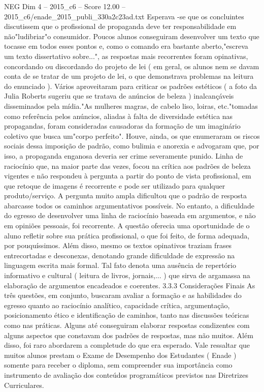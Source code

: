 \begin{textsample}{NEG Dim 4 – 2015\_c6 – Score 12.00 – 2015\_c6/enade\_2015\_publi\_330a2c23ad.txt}
Esperava -se que os concluintes discutissem que o profissional de propaganda deve ter responsabilidade em não"ludibriar"o consumidor.
Poucos alunos conseguiram desenvolver um texto que tocasse em todos esses pontos e, como o comando era bastante aberto,"escreva um texto dissertativo sobre...", as respostas mais recorrentes foram opinativas, concordando ou discordando do projeto de lei ( em geral, os alunos nem se davam conta de se tratar de um projeto de lei, o que demonstrava problemas na leitura do enunciado ).
Vários aproveitaram para criticar os padrões estéticos ( a foto da Julia Roberts sugeriu que se tratava de anúncios de beleza ) inalcançáveis disseminados pela mídia."As mulheres magras, de cabelo liso, loiras, etc."tomadas como referência pelos anúncios, aliadas à falta de diversidade estética nas propagandas, foram consideradas causadoras da formação de um imaginário coletivo que busca um"corpo perfeito".
Houve, ainda, os que enumeraram os riscos sociais dessa imposição de padrão, como bulimia e anorexia e advogaram que, por isso, a propaganda enganosa deveria ser crime severamente punido.
Linha de raciocínio que, na maior parte das vezes, focou na crítica aos padrões de beleza vigentes e não respondeu à pergunta a partir do ponto de vista profissional, em que retoque de imagens é recorrente e pode ser utilizado para qualquer produto/serviço.
A pergunta muito ampla dificultou que o padrão de resposta abarcasse todos os caminhos argumentativos possíveis.
No entanto, a dificuldade do egresso de desenvolver uma linha de raciocínio baseada em argumentos, e não em opiniões pessoais, foi recorrente.
A questão oferecia uma oportunidade de o aluno refletir sobre sua prática profissional, o que foi feito, de forma adequada, por pouquíssimos.
Além disso, mesmo os textos opinativos traziam frases entrecortadas e desconexas, denotando grande dificuldade de expressão na linguagem escrita mais formal.
Tal fato denota uma ausência de repertório informativo e cultural ( leitura de livros, jornais,... ) que sirva de argamassa na elaboração de argumentos encadeados e coerentes. 3.3.3 Considerações Finais As três questões, em conjunto, buscaram avaliar a formação e as habilidades do egresso quanto ao raciocínio analítico, capacidade crítica, argumentação, posicionamento ético e identificação de caminhos, tanto nas discussões teóricas como nas práticas.
Alguns até conseguiram elaborar respostas condizentes com alguns aspectos que constavam dos padrões de respostas, mas não muitos.
Além disso, foi raro abordarem a completude do que era esperado.
Vale ressaltar que muitos alunos prestam o Exame de Desempenho dos Estudantes ( Enade ) somente para receber o diploma, sem compreender sua importância como instrumento de avaliação dos conteúdos programáticos previstos nas Diretrizes Curriculares.

\end{textsample}
